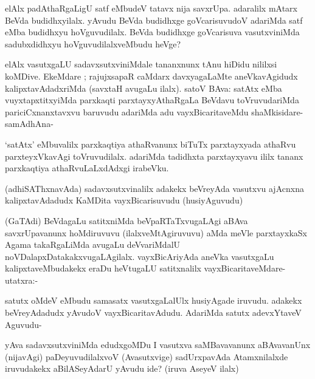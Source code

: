 
\begin{artha}
elAlx padAthaRgaLigU satf eMbudeV tatavx nija savxrUpa. adaralilx mAtarx BeVda budidhxyilalx. yAvudu BeVda budidhxge goVcarisuvudoV adariMda satf eMba budidhxyu hoVguvudilalx. BeVda budidhxge goVcarisuva vasutxviniMda sadubxdidhxyu hoVguvudilalxveMbudu heVge?
\end{artha}

\begin{artha}
elAlx vasutxgaLU sadavxsutxviniMdale tananxnunx tAnu hiDidu nililxsi koMDive. EkeMdare ; rajujxsapaR caMdarx davxyagaLaMte aneVkavAgidudx kalipxtavAdadxriMda (savxtaH avugaLu ilalx). satoV BAva: satAtx eMba vuyxtapxtitxyiMda parxkaqti parxtayxyAthaRgaLa BeVdavu toVruvudariMda pariciCxnanxtavxvu baruvudu adariMda adu vayxBicaritaveMdu shaMkisidare- samAdhAna-
\end{artha}

\begin{artha}
`satAtx' eMbuvalilx parxkaqtiya athaRvanunx biTuTx parxtayxyada athaRvu parxteyxVkavAgi toVruvudilalx. adariMda tadidhxta parxtayxyavu ililx tananx parxkaqtiya athaRvuLaLxdAdxgi irabeVku.
\end{artha}

\begin{artha}
(adhiSAThxnavAda) sadavxsutxvinalilx adakekx beVreyAda vasutxvu ajAcnxna kalipxtavAdadudx KaMDita vayxBicarisuvudu (husiyAguvudu)
\end{artha}

\begin{artha}
(GaTAdi) BeVdagaLu satitxniMda beVpaRTaTxvugaLAgi aBAva savxrUpavanunx hoMdiruvuvu (ilalxveMtAgiruvuvu) aMda meVle parxtayxkaSx Agama takaRgaLiMda avugaLu deVvariMdalU noVDalapxDatakakxvugaLAgilalx. vayxBicAriyAda aneVka vasutxgaLu kalipxtaveMbudakekx eraDu heVtugaLU satitxnalilx vayxBicaritaveMdare- utatxra:-
\end{artha}

\begin{artha}
satutx oMdeV eMbudu samasatx vasutxgaLalUlx husiyAgade iruvudu. adakekx beVreyAdadudx yAvudoV vayxBicaritavAdudu. AdariMda satutx adevxYtaveV Aguvudu-
\end{artha}

\begin{artha}
yAva sadavxsutxviniMda edudxgoMDu I vasutxva saMBavavanunx aBAvavanUnx (nijavAgi) paDeyuvudilalxvoV (Avasutxvige) sadUrxpavAda Atamxnilalxde iruvudakekx aBilASeyAdarU yAvudu ide? (iruva AseyeV ilalx)
\end{artha}

